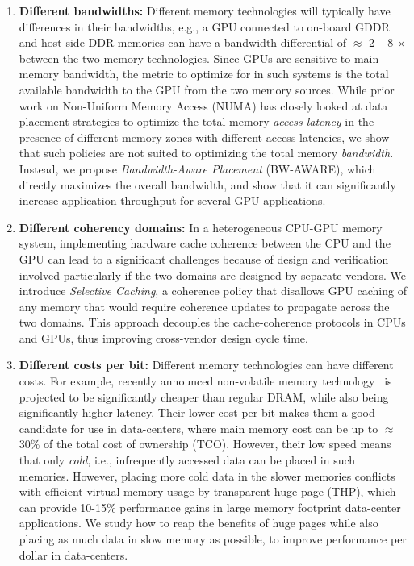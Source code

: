 \begin{enumerate}
\item
\textbf{Different bandwidths:}
Different memory technologies will typically have differences in their
bandwidths, e.g., a GPU connected to on-board GDDR and host-side DDR memories
can have a bandwidth differential of $\approx$ 2 -- 8 $\times$ between the two
memory technologies. Since GPUs are sensitive to main memory bandwidth, the
metric to optimize for in such systems is the total available bandwidth to the
GPU from the two memory sources. While prior work on Non-Uniform Memory Access
(NUMA) has closely looked at data placement strategies to optimize the total
memory {\it access latency} in the presence of different memory zones with
different access latencies, we show that such policies are not suited to
optimizing the total memory {\it bandwidth}. Instead, we propose {\it
Bandwidth-Aware Placement} (BW-AWARE), which directly maximizes the overall
bandwidth, and show that it can significantly increase application throughput
for several GPU applications.

\item
\textbf{Different coherency domains:} 
In a heterogeneous CPU-GPU memory system, implementing hardware cache coherence
between the CPU and the GPU can lead to a significant challenges because of
design and verification involved particularly if the two domains are designed by
separate vendors. We introduce {\it Selective Caching}, a coherence policy that
disallows GPU caching of any memory that would require coherence updates to
propagate across the two domains. This approach decouples the cache-coherence
protocols in CPUs and GPUs, thus improving cross-vendor design cycle time.

\item
\textbf{Different costs per bit:}
Different memory technologies can have different costs.  For example, recently
announced non-volatile memory technology~\cite{xpoint} is projected to be
significantly cheaper than regular DRAM, while also being significantly higher
latency. Their lower cost per bit makes them a good candidate for use in
data-centers, where main memory cost can be up to $\approx$ 30\% of the total
cost of ownership (TCO). However, their low speed means that only {\it cold},
i.e., infrequently accessed data can be placed in such memories. However, placing more
cold data in the slower memories conflicts with efficient virtual memory usage
by transparent huge page (THP), which can provide 10-15\% performance gains in
large memory footprint data-center applications. We study how to reap the
benefits of huge pages while also placing as much data in slow memory as
possible, to improve performance per dollar in data-centers.
\end{enumerate}

